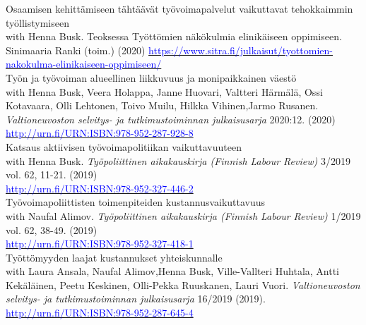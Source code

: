 \documentclass[16pt]{article}
\begin{document}
\noindent Osaamisen kehitt\"{a}miseen t\"{a}ht\"{a}\"{a}v\"{a}t ty\"{o}voimapalvelut vaikuttavat tehokkaimmin ty\"{o}llistymiseen \\
\noindent with Henna Busk. Teoksessa Työttömien näkökulmia elinikäiseen oppimiseen. Sinimaaria Ranki (toim.) (2020) \href{https://www.sitra.fi/julkaisut/tyottomien-nakokulma-elinikaiseen-oppimiseen/}{\textcolor{blue}{https://www.sitra.fi/julkaisut/tyottomien-nakokulma-elinikaiseen-oppimiseen/}} \\

\noindent Ty\"{o}n ja ty\"{o}voiman alueellinen liikkuvuus ja monipaikkainen v\"{a}est\"{o} \\
\noindent with Henna Busk, Veera Holappa, Janne Huovari, Valtteri H\"{a}rm\"{a}l\"{a}, Ossi Kotavaara, Olli Lehtonen, Toivo Muilu, Hilkka Vihinen,Jarmo Rusanen. \textit{Valtioneuvoston selvitys- ja tutkimustoiminnan julkaisusarja} 2020:12. (2020) \href{http://urn.fi/URN:ISBN:978-952-287-928-8}{\textcolor{blue}{http://urn.fi/URN:ISBN:978-952-287-928-8}} \\

\noindent Katsaus aktiivisen ty\"{o}voimapolitiikan vaikuttavuuteen \\
\noindent with Henna Busk. \textit{Ty\"{o}poliittinen aikakauskirja (Finnish Labour Review)} 3/2019 vol. 62, 11-21.  (2019) \\
\noindent \href{http://urn.fi/URN:ISBN:978-952-327-446-2}{\textcolor{blue}{http://urn.fi/URN:ISBN:978-952-327-446-2}} \\

\noindent Ty\"{o}voimapoliittisten toimenpiteiden kustannusvaikuttavuus \\
\noindent with Naufal Alimov. \textit{Ty\"{o}poliittinen aikakauskirja (Finnish Labour Review)} 1/2019 vol. 62, 38-49.  (2019) \\
\noindent \href{http://urn.fi/URN:ISBN:978-952-287-645-4}{\textcolor{blue}{http://urn.fi/URN:ISBN:978-952-327-418-1}} \\

\noindent Ty\"{o}tt\"{o}myyden laajat kustannukset yhteiskunnalle \\
\noindent with Laura Ansala, Naufal Alimov,Henna Busk, Ville-Vallteri Huhtala, Antti Kek\"{a}l\"{a}inen, Peetu Keskinen, Olli-Pekka Ruuskanen, Lauri Vuori.  \textit{Valtioneuvoston selvitys- ja tutkimustoiminnan julkaisusarja} 16/2019 (2019). \href{http://urn.fi/URN:ISBN:978-952-287-645-4}{\textcolor{blue}{http://urn.fi/URN:ISBN:978-952-287-645-4}} \\
\end{document}
